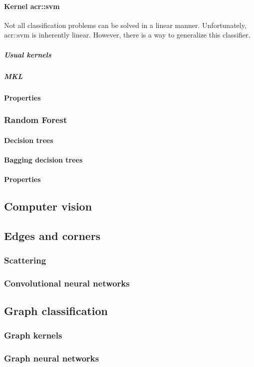             \paragraph{Kernel \acrshort*{acr::svm}}
                Not all classification problems can be solved in a linear manner.
                Unfortunately, \gls{acr::svm} is inherently linear.
                However, there is a way to generalize this classifier.


                \subparagraph{Usual kernels}
                \subparagraph{MKL}
            \paragraph{Properties}
        \subsubsection{Random Forest}
            \paragraph{Decision trees}
            \paragraph{Bagging decision trees}
            \paragraph{Properties}
    \subsection{Computer vision}
        \subsection{Edges and corners}
        \subsubsection{Scattering}
        \subsubsection{Convolutional neural networks}
    \subsection{Graph classification}
        \subsubsection{Graph kernels}
        \subsubsection{Graph neural networks}
